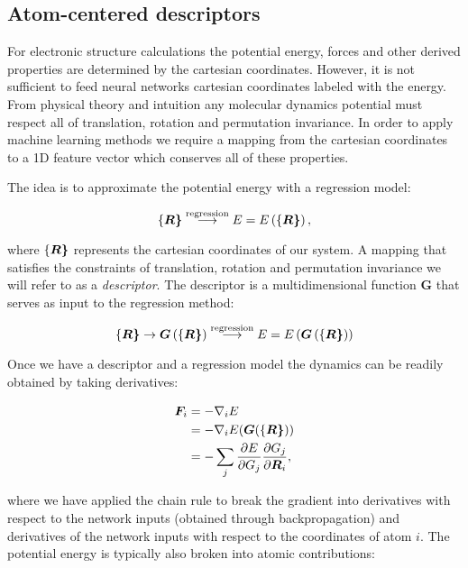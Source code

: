\subsection{Atom-centered descriptors}
For electronic structure calculations the potential energy,
forces and other derived properties are determined by
the cartesian coordinates. However, it is not sufficient
to feed neural networks cartesian coordinates labeled with
the energy. From physical theory and intuition any molecular dynamics
potential must respect all of translation, rotation and permutation invariance.
In order to apply machine learning methods we require a mapping from
the cartesian coordinates to a 1D feature vector which conserves
all of these properties.
\par
The idea is to approximate the potential energy with a regression model:

\begin{equation}
\left\{\bm{R\right\}} \overset{\text{regression}}{\longrightarrow} 
E = E\left( \left\{\bm{R\right\}} \right) ,
\end{equation}

where $\left\{\bm{R\right\}}$ represents the cartesian coordinates of our system.
A mapping that satisfies the constraints of translation, rotation
and permutation invariance we will refer to as a \textit{descriptor}.
The descriptor is a multidimensional function $\bm{G}$
that serves as input to the regression method:

\begin{equation}
\left\{\bm{R\right\}} \rightarrow \bm{G} \left(\left\{\bm{R\right\}} \right)
\overset{\text{regression}}{\longrightarrow}
E = E \left(\bm{G}\left(\left\{\bm{R\right\}}\right)\right)
\end{equation}

Once we have a descriptor and a regression model the dynamics
can be readily obtained by taking derivatives:

\begin{equation}
\begin{split}
    \bm{F}_i &= -\nabla_i E \\
    &= -\nabla_i
    E(\bm{G}(\left\{\bm{R\right\}})) \\
    &= -\sum_j \frac{\partial E}
    {\partial G_j} \frac{\partial G_j}{\partial \bm{R}_i} ,
\end{split}
\end{equation}

where we have applied the chain rule to break the gradient
into derivatives with respect to the network inputs (obtained through
backpropagation) and derivatives of the network inputs with
respect to the coordinates of atom $i$.
The potential energy is typically also broken into
atomic contributions:

